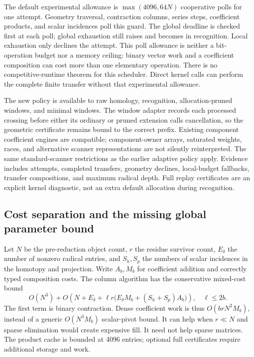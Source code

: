 The default experimental allowance is $\max(4096,64N)$ cooperative polls for
one attempt. Geometry traversal, contraction columns, series steps, coefficient
products, and scalar incidences poll this guard. The global deadline is
checked first at each poll; global exhaustion still raises 
and becomes  in recognition. Local exhaustion only declines
the attempt. This poll allowance is neither a bit-operation budget nor a
memory ceiling: binary vector work and a coefficient composition can cost
more than one elementary operation. There is no competitive-runtime theorem
for this scheduler. Direct kernel calls can perform the complete finite
transfer without that experimental allowance.

The new policy is available to raw homology, recognition, allocation-pruned
windows, and minimal windows. The window adapter records each processed
crossing before either its ordinary or pruned extension calls cancellation,
so the geometric certificate remains bound to the correct prefix. Existing
component coefficient engines are compatible; component-owner arrays,
saturated weights, races, and alternative scanner representations are not
silently reinterpreted. The same standard-scanner restrictions as the earlier
adaptive policy apply. Evidence includes attempts, completed transfers,
geometry declines, local-budget fallbacks, transfer compositions, and maximum
radical depth. Full replay certificates are an explicit kernel diagnostic,
not an extra default allocation during recognition.

\subsection{Cost separation and the missing global parameter bound}
Let $N$ be the pre-reduction object count, $r$ the residue survivor count,
$E_\delta$ the number of nonzero radical entries, and $S_h,S_p$ the numbers
of scalar incidences in the homotopy and projection. Write $A_b,M_b$ for
coefficient addition and correctly typed composition costs. The column
algorithm has the conservative mixed-cost bound
\[
 O(N^3)+O\!\left(N+E_\delta+
 \ell r\bigl(E_\delta M_b+(S_h+S_p)A_b\bigr)\right),\quad \ell\le2b.
\]
The first term is binary contraction. Dense coefficient work is thus
$O(brN^2M_b)$, instead of a generic $O(N^3M_b)$ scalar-pivot bound. It can
help when $r\ll N$ and sparse elimination would create expensive fill.
It need not help sparse matrices. The product cache is bounded at 4096
entries; optional full certificates require additional storage and work.

